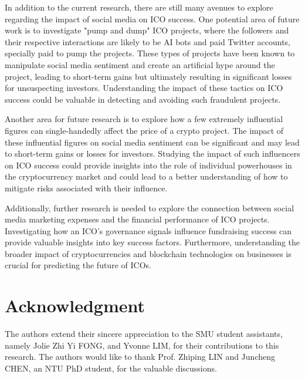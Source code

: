 \documentclass[runningheads]{llncs}
\begin{document}
In addition to the current research, there are still many avenues to explore regarding the impact of social media on ICO success. One potential area of future work is to investigate "pump and dump" ICO projects, where the followers and their respective interactions are likely to be AI bots and paid Twitter accounts, specially paid to pump the projects. These types of projects have been known to manipulate social media sentiment and create an artificial hype around the project, leading to short-term gains but ultimately resulting in significant losses for unsuspecting investors. Understanding the impact of these tactics on ICO success could be valuable in detecting and avoiding such fraudulent projects.

Another area for future research is to explore how a few extremely influential figures can single-handedly affect the price of a crypto project. The impact of these influential figures on social media sentiment can be significant and may lead to short-term gains or losses for investors. Studying the impact of such influencers on ICO success could provide insights into the role of individual powerhouses in the cryptocurrency market and could lead to a better understanding of how to mitigate risks associated with their influence. 

Additionally, further research is needed to explore the connection between social media marketing expenses and the financial performance of ICO projects. Investigating how an ICO's governance signals influence fundraising success can provide valuable insights into key success factors. Furthermore, understanding the broader impact of cryptocurrencies and blockchain technologies on businesses is crucial for predicting the future of ICOs.

\section*{Acknowledgment}
The authors extend their sincere appreciation to the SMU student assistants, namely Jolie Zhi Yi FONG, and Yvonne LIM, for their contributions to this research. The authors would like to thank Prof. Zhiping LIN and Juncheng CHEN, an NTU PhD student, for the valuable discussions. 




\appendix
\end{document}
